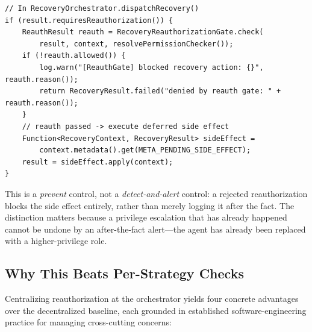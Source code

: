 \begin{lstlisting}[caption={\reauthgate{} in \code{RecoveryOrchestrator}: side effect deferred until reauth passes.},label={lst:reauthgate}]
// In RecoveryOrchestrator.dispatchRecovery()
if (result.requiresReauthorization()) {
    ReauthResult reauth = RecoveryReauthorizationGate.check(
        result, context, resolvePermissionChecker());
    if (!reauth.allowed()) {
        log.warn("[ReauthGate] blocked recovery action: {}", reauth.reason());
        return RecoveryResult.failed("denied by reauth gate: " + reauth.reason());
    }
    // reauth passed -> execute deferred side effect
    Function<RecoveryContext, RecoveryResult> sideEffect =
        context.metadata().get(META_PENDING_SIDE_EFFECT);
    result = sideEffect.apply(context);
}
\end{lstlisting}

This is a \emph{prevent} control, not a \emph{detect-and-alert} control: a rejected reauthorization blocks the side effect entirely, rather than merely logging it after the fact. The distinction matters because a privilege escalation that has already happened cannot be undone by an after-the-fact alert---the agent has already been replaced with a higher-privilege role.

\subsection{Why This Beats Per-Strategy Checks}
\label{sec:why-centralize-pattern}

Centralizing reauthorization at the orchestrator yields four concrete advantages over the decentralized baseline, each grounded in established software-engineering practice for managing cross-cutting concerns:


